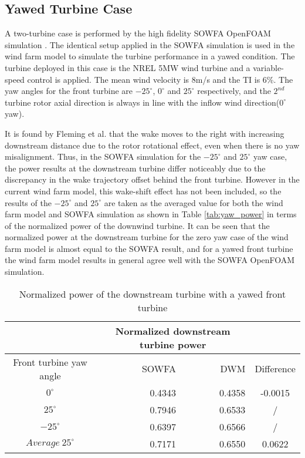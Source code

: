 \documentclass{umthesis}
\begin{document}
\subsection{Yawed Turbine Case}
A two-turbine case is performed by the high fidelity SOWFA OpenFOAM simulation \cite{Fleming_2013}. The identical setup applied in the SOWFA simulation is used in the wind farm model to simulate the turbine performance in a yawed condition. The turbine deployed in this case is the NREL 5MW wind turbine and a variable-speed control is applied\cite{5MW}. The mean wind velocity is 8m/s and the TI is 6\%. The yaw angles for the front turbine are $-25^\circ$, $0^\circ$ and $25^\circ$ respectively, and the $2^{nd}$ turbine rotor axial direction is always in line with the inflow wind direction($0^\circ$ yaw).

It is found by Fleming et al. that the wake moves to the right with increasing downstream distance due to the rotor rotational effect, even when there is no yaw misalignment\cite{Fleming_redirecting}. Thus, in the SOWFA simulation for the $-25^\circ$ and $25^\circ$ yaw case, the power results at the downstream turbine differ noticeably due to the discrepancy in the wake trajectory offset behind the front turbine. However in the current wind farm model, this wake-shift effect has not been included, so the results of the $-25^\circ$ and $25^\circ$ are taken as the averaged value for both the wind farm model and SOWFA simulation as shown in Table \ref{tab:yaw_power} in terms of the normalized power of the downwind turbine. It can be seen that the normalized power at the downstream turbine for the zero yaw case of the wind farm model is almost equal to the SOWFA result, and for a yawed front turbine the wind farm model results in general agree well with the SOWFA OpenFOAM simulation.
\begin{table}[h] \label{tab:yaw_power}
\caption{Normalized power of the downstream turbine with a yawed front turbine}
\centering
\begin{tabular}{c rr c}
\hline\hline
&\multicolumn{2}{c}{Normalized downstream turbine power} & \\ [0.5ex]
\hline
Front turbine yaw angle&SOWFA&DWM&Difference\\
\(\displaystyle 0 ^\circ \)&0.4343&0.4358&-0.0015\\
\(\displaystyle 25 ^\circ \)&0.7946&0.6533&/ \\
\(\displaystyle -25 ^\circ \)&0.6397&0.6566&/ \\
\(\displaystyle Average\ 25 ^\circ \)&0.7171&0.6550&0.0622\\
\hline %
\end{tabular}
\label{tab:hresult}
\end{table}
\end{document}
